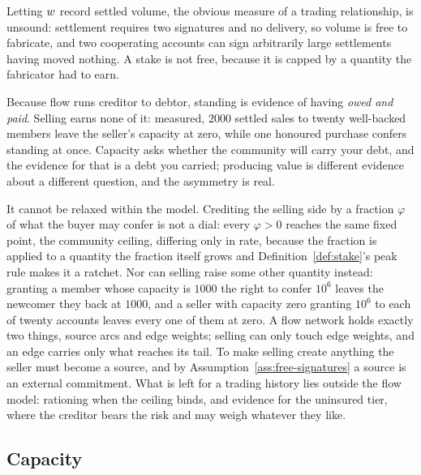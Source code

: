 \begin{remark}
\label{rem:not-volume}
Letting $w$ record settled volume, the obvious measure of a trading relationship,
is unsound: settlement requires two signatures and no delivery, so volume is free to
fabricate, and two cooperating accounts can sign arbitrarily large settlements having
moved nothing. A stake is not free, because it is capped by a quantity the fabricator
had to earn.
\end{remark}

\begin{remark}
\label{rem:owed-not-sold}
Because flow runs creditor to debtor, standing is evidence of having \emph{owed and
paid}. Selling earns none of it: measured, $2000$ settled sales to twenty well-backed
members leave the seller's capacity at zero, while one honoured purchase confers standing
at once. Capacity asks whether the community will carry your debt, and the evidence for
that is a debt you carried; producing value is different evidence about a different
question, and the asymmetry is real.

It cannot be relaxed within the model. Crediting the selling side by a fraction $\varphi$
of what the buyer may confer is not a dial: every $\varphi>0$ reaches the same fixed
point, the community ceiling, differing only in rate, because the fraction is applied to
a quantity the fraction itself grows and Definition~\ref{def:stake}'s peak rule makes it a
ratchet. Nor can selling raise some other quantity instead: granting a member whose
capacity is $1000$ the right to confer $10^{6}$ leaves the newcomer they back at $1000$,
and a seller with capacity zero granting $10^{6}$ to each of twenty accounts leaves every
one of them at zero. A flow network holds exactly two things, source arcs and edge
weights; selling can only touch edge weights, and an edge carries only what reaches its
tail. To make selling create anything the seller must become a source, and by
Assumption~\ref{ass:free-signatures} a source is an external commitment. What is left for
a trading history lies outside the flow model: rationing when the ceiling binds, and
evidence for the uninsured tier, where the creditor bears the risk and may weigh whatever
they like.
\end{remark}

\subsection{Capacity}

